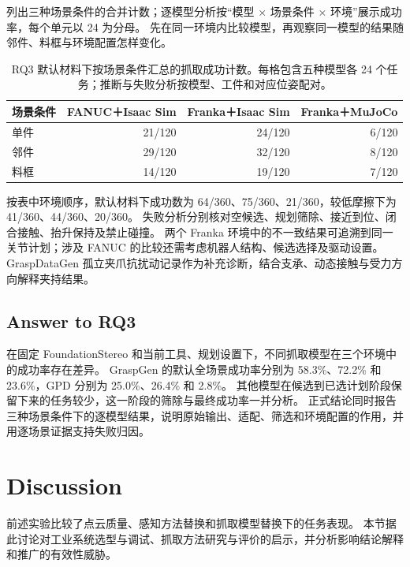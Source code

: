 \documentclass[UTF8,fontset=fandol,a4paper,11pt]{ctexart}
\newcommand{\qyb}[1]{\textcolor{red!75!black}{#1}}
\begin{document}
列出三种场景条件的合并计数；逐模型分析按“模型 × 场景条件 × 环境”展示成功率，每个单元以 24 为分母。
先在同一环境内比较模型，再观察同一模型的结果随邻件、料框与环境配置怎样变化。

\begin{table}[H]
\centering\small
\caption{RQ3 默认材料下按场景条件汇总的抓取成功计数。每格包含五种模型各 24 个任务；推断与失败分析按模型、工件和对应位姿配对。}
\label{tab:rq3-scenes}
\begin{tabularx}{\linewidth}{Y r r r}
\toprule
场景条件 & FANUC＋Isaac Sim & Franka＋Isaac Sim & Franka＋MuJoCo \\
\midrule
单件 & 21/120 & 24/120 & 6/120 \\
邻件 & 29/120 & 32/120 & 8/120 \\
料框 & 14/120 & 19/120 & 7/120 \\
\bottomrule
\end{tabularx}
\end{table}

按表中环境顺序，默认材料下成功数为 64/360、75/360、21/360，较低摩擦下为 41/360、44/360、20/360。
失败分析分别核对空候选、规划筛除、接近到位、闭合接触、抬升保持及禁止碰撞。
两个 Franka 环境中的不一致结果可追溯到同一关节计划；涉及 FANUC 的比较还需考虑机器人结构、候选选择及驱动设置。
GraspDataGen 孤立夹爪抗扰动记录作为补充诊断，结合支承、动态接触与受力方向解释夹持结果。

\subsection{\qyb{Answer to RQ3}}

在固定 FoundationStereo 和当前工具、规划设置下，不同抓取模型在三个环境中的成功率存在差异。
GraspGen 的默认全场景成功率分别为 58.3\%、72.2\% 和 23.6\%，GPD 分别为 25.0\%、26.4\% 和 2.8\%。
其他模型在候选到已选计划阶段保留下来的任务较少，这一阶段的筛除与最终成功率一并分析。
正式结论同时报告三种场景条件下的逐模型结果，说明原始输出、适配、筛选和环境配置的作用，并用逐场景证据支持失败归因。

\section{\qyb{Discussion}}
\label{sec:discussion}

前述实验比较了点云质量、感知方法替换和抓取模型替换下的任务表现。
本节据此讨论对工业系统选型与调试、抓取方法研究与评价的启示，并分析影响结论解释和推广的有效性威胁。
\end{document}
